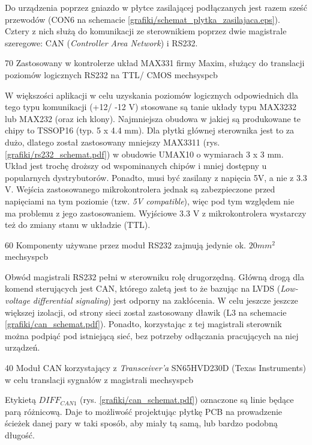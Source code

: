 Do urządzenia poprzez gniazdo w płytce zasilającej podłączanych jest razem sześć przewodów (CON6 na schemacie \ref{grafiki/schemat_plytka_zasilajaca.eps}). Cztery z nich służą do komunikacji ze sterownikiem poprzez dwie magistrale szeregowe: CAN ({\it Controller Area Network}) i RS232.

	{70}
	{Zastosowany w kontrolerze układ MAX331 firmy Maxim, służący do translacji poziomów logicznych RS232 na TTL/ CMOS}
	{mechsyspcb}

W większości aplikacji w celu uzyskania poziomów logicznych odpowiednich dla tego typu komunikacji (+12/ -12 V) stosowane są tanie układy typu MAX3232 lub MAX232 (oraz ich klony). Najmniejsza obudowa w jakiej są produkowane te chipy to TSSOP16 (typ. 5 x 4.4 mm). Dla płytki głównej sterownika jest to za dużo, dlatego został zastosowany mniejszy   MAX3311 (rys. \ref{grafiki/rs232_schemat.pdf}) w obudowie UMAX10 o wymiarach 3 x 3 mm. Układ jest trochę droższy od wspominanych chipów i mniej dostępny u popularnych dystrybutorów. Ponadto, musi być zasilany z napięcia 5V, a nie z 3.3 V. Wejścia zastosowanego mikrokontrolera jednak są zabezpieczone przed napięciami na tym poziomie (tzw. {\it 5V compatible}), więc pod tym względem nie ma problemu z jego zastosowaniem. Wyjściowe 3.3 V z mikrokontrolera wystarczy też do zmiany stanu w układzie (TTL).

	{60}
	{Komponenty używane przez moduł RS232 zajmują jedynie ok. $ 20 mm^2 $}
	{mechsyspcb}

Obwód magistrali RS232 pełni w sterowniku rolę drugorzędną. Główną drogą dla komend sterujących jest CAN, którego zaletą jest to że bazując na LVDS ({\it Low-voltage differential signaling}) jest odporny na zakłócenia. W celu jeszcze jeszcze większej izolacji, od strony sieci został zastosowany dławik (L3 na schemacie \ref{grafiki/can_schemat.pdf}). Ponadto, korzystając z tej magistrali sterownik można podpiąć pod istniejącą sieć, bez potrzeby odłączania pracujących na niej urządzeń.

	{40}
	{Moduł CAN korzystający z {\it Transceiver'a} SN65HVD230D (Texas Instruments) w celu translacji sygnałów z magistrali}
	{mechsyspcb}
	
Etykietą $ DIFF_{CAN1} $ (rys. \ref{grafiki/can_schemat.pdf}) oznaczone są linie będące parą różnicową. Daje to możliwość projektując płytkę PCB na prowadzenie ścieżek danej pary w taki sposób, aby miały tą samą, lub bardzo podobną długość.

